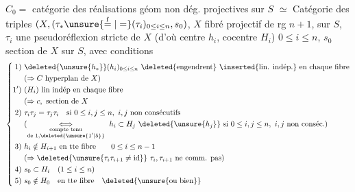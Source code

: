 $\boxed{C_0}={}$ catégorie  des réalisations géom non dég. projectives sur $S$
$\simeq{}$ Catégorie des triples $(X,(\tau_*\unsure{\overset{\mathrm f}{=}|=}(\tau_i)_{0\leq i\leq n},s_0)$, $X$ fibré projectif de rg $n+1$, sur $S$, $\tau_i$ une pseudoréflexion stricte de $X$ (d'où centre $h_i$, cocentre $H_i$) $0\leq i\leq n$, $s_0$ section de $X$ sur $S$, avec conditions
\[
\left\{\begin{aligned}
1)\ &\deleted{\unsure{h_*}}(h_i)_{0\leq i\leq n}\ \deleted{\text{engendrent}}\ \inserted{\text{lin. indép.}}\ \text{en chaque fibre}\\
&(\Rightarrow C\text{ hyperplan de }X)\\
1')\ &(H_i)\ \text{lin indép en chaque fibre}\\
&(\Rightarrow c,\text{ section de }X\\
2)\ &\tau_i\tau_j=\tau_j\tau_i\quad\text{si }0\leq i,j\leq n,\ i,j\text{ non consécutifs}\\
&(\underset{\substack{\text{compte tenu}\\\text{de }1,\deleted{\unsure{1'|5}}}}{\Longleftrightarrow}\ h_i\subset H_j\ \deleted{\unsure{h_j}}\text{ si }0\leq i,j\leq n,\ i,j\text{ non conséc.})\\
3)\ &h_i\notin H_{i+1}\ \text{en tte fibre}\qquad 0\leq i\leq n-1\\
&(\Rightarrow\deleted{\unsure{\tau_i\tau_{i+1}\ne\mathrm{id}}}\ \tau_i,\tau_{i+1}\text{ ne comm. pas})\\
4)\ &s_0\subset H_i\quad(1\leq i\leq n)\\
5)\ &s_0\notin H_0\quad\text{en tte fibre}\quad\deleted{\unsure{\text{ou bien}}}
\end{aligned}\right.
\]

